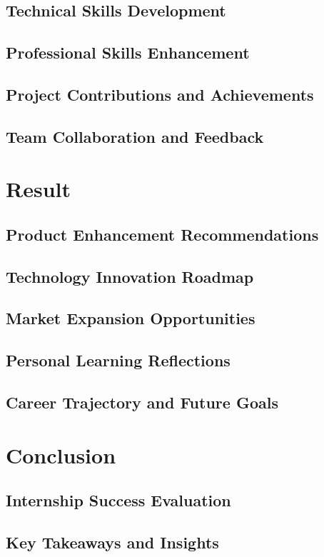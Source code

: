 \documentclass[a4paper, 11pt, oneside]{report}
\begin{document}
  \section{Technical Skills Development}
  \section{Professional Skills Enhancement}
  \section{Project Contributions and Achievements}
  \section{Team Collaboration and Feedback}
  

\chapter{Result}
  \section{Product Enhancement Recommendations}
  \section{Technology Innovation Roadmap}
  \section{Market Expansion Opportunities}
  \section{Personal Learning Reflections}
  \section{Career Trajectory and Future Goals}
  

\chapter{Conclusion}
  \section{Internship Success Evaluation}
  \section{Key Takeaways and Insights}
\end{document}
